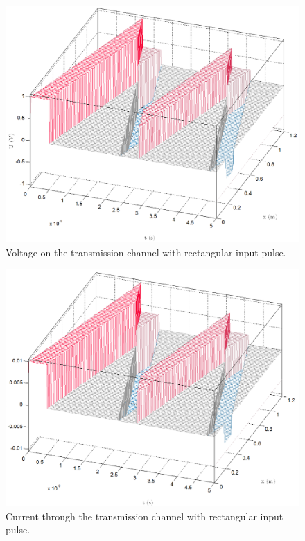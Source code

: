 \documentclass[final]{scrreprt} %
\begin{document}
\begin{figure}[H]
	\centering
	\includegraphics[width=\linewidth]{resources/Voltage100Ohm.png}
	\caption{Voltage on the transmission channel with rectangular input pulse.}
	\label{fig:voltage}
\end{figure}

\begin{figure}[H]
	\centering
	\includegraphics[width=\linewidth]{resources/Current100Ohm.png}
	\caption{Current through the transmission channel with rectangular input pulse.}
	\label{fig:current}
\end{figure}
\end{document}
